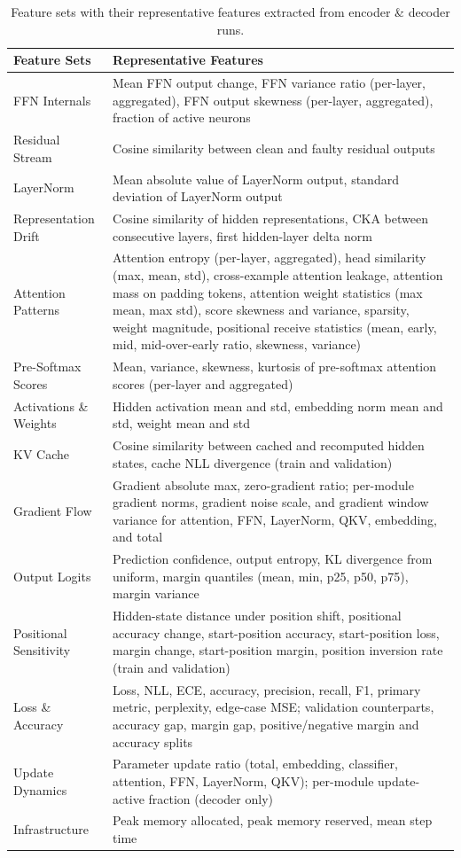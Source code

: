 \begin{table}[!htbp]
\centering
\caption{Feature sets with their representative features extracted from encoder \& decoder runs.}
\label{tab:feature-families}
\footnotesize
\begin{tabular}{@{}p{2.5cm} p{12.0cm}@{}}
\toprule
\textbf{Feature Sets} & \textbf{Representative Features} \\
\midrule
FFN Internals &
  Mean FFN output change, FFN variance ratio (per-layer, aggregated), FFN output skewness (per-layer, aggregated), fraction of active neurons \\
Residual Stream &
  Cosine similarity between clean and faulty residual outputs \\
LayerNorm &
  Mean absolute value of LayerNorm output, standard deviation of LayerNorm output \\
Representation Drift &
  Cosine similarity of hidden representations, CKA between consecutive layers, first hidden-layer delta norm \\
Attention Patterns &
  Attention entropy (per-layer, aggregated), head similarity (max, mean, std), cross-example attention leakage, attention mass on padding tokens, attention weight statistics (max mean, max std), score skewness and variance, sparsity, weight magnitude, positional receive statistics (mean, early, mid, mid-over-early ratio, skewness, variance) \\
Pre-Softmax Scores &
  Mean, variance, skewness, kurtosis of pre-softmax attention scores (per-layer and aggregated) \\
Activations \& Weights &
  Hidden activation mean and std, embedding norm mean and std, weight mean and std \\
KV Cache &
  Cosine similarity between cached and recomputed hidden states, cache NLL divergence (train and validation) \\
Gradient Flow &
  Gradient absolute max, zero-gradient ratio; per-module gradient norms, gradient noise scale, and gradient window variance for attention, FFN, LayerNorm, QKV, embedding, and total \\
Output Logits &
  Prediction confidence, output entropy, KL divergence from uniform, margin quantiles (mean, min, p25, p50, p75), margin variance \\
Positional Sensitivity &
  Hidden-state distance under position shift, positional accuracy change, start-position accuracy, start-position loss, margin change, start-position margin, position inversion rate (train and validation) \\
Loss \& Accuracy &
  Loss, NLL, ECE, accuracy, precision, recall, F1, primary metric, perplexity, edge-case MSE; validation counterparts, accuracy gap, margin gap, positive/negative margin and accuracy splits \\
Update Dynamics &
  Parameter update ratio (total, embedding, classifier, attention, FFN, LayerNorm, QKV); per-module update-active fraction (decoder only) \\
Infrastructure &
  Peak memory allocated, peak memory reserved, mean step time \\
\bottomrule
\end{tabular}
\end{table}
